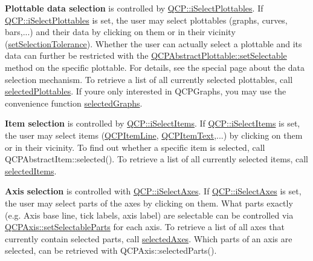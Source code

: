 {\bfseries Plottable data selection} is controlled by \mbox{\hyperlink{namespace_q_c_p_a2ad6bb6281c7c2d593d4277b44c2b037a67148c8227b4155eca49135fc274c7ec}{Q\+C\+P\+::i\+Select\+Plottables}}. If \mbox{\hyperlink{namespace_q_c_p_a2ad6bb6281c7c2d593d4277b44c2b037a67148c8227b4155eca49135fc274c7ec}{Q\+C\+P\+::i\+Select\+Plottables}} is set, the user may select plottables (graphs, curves, bars,...) and their data by clicking on them or in their vicinity (\mbox{\hyperlink{class_q_custom_plot_a4dc31241d7b09680950e19e5f971ed93}{set\+Selection\+Tolerance}}). Whether the user can actually select a plottable and its data can further be restricted with the \mbox{\hyperlink{class_q_c_p_abstract_plottable_ac238d6e910f976f1f30d41c2bca44ac3}{Q\+C\+P\+Abstract\+Plottable\+::set\+Selectable}} method on the specific plottable. For details, see the special page about the data selection mechanism. To retrieve a list of all currently selected plottables, call \mbox{\hyperlink{class_q_custom_plot_a747faaab57c56891e901a1e97fa4359a}{selected\+Plottables}}. If you\textquotesingle{}re only interested in Q\+C\+P\+Graphs, you may use the convenience function \mbox{\hyperlink{class_q_custom_plot_ad3547aded026d8a9ae6ef13a69080d06}{selected\+Graphs}}.

{\bfseries Item selection} is controlled by \mbox{\hyperlink{namespace_q_c_p_a2ad6bb6281c7c2d593d4277b44c2b037aea2f7c105d674e76d9b187b02ef29260}{Q\+C\+P\+::i\+Select\+Items}}. If \mbox{\hyperlink{namespace_q_c_p_a2ad6bb6281c7c2d593d4277b44c2b037aea2f7c105d674e76d9b187b02ef29260}{Q\+C\+P\+::i\+Select\+Items}} is set, the user may select items (\mbox{\hyperlink{class_q_c_p_item_line}{Q\+C\+P\+Item\+Line}}, \mbox{\hyperlink{class_q_c_p_item_text}{Q\+C\+P\+Item\+Text}},...) by clicking on them or in their vicinity. To find out whether a specific item is selected, call Q\+C\+P\+Abstract\+Item\+::selected(). To retrieve a list of all currently selected items, call \mbox{\hyperlink{class_q_custom_plot_afda487bcf2d6cf1a57173d82495e29ba}{selected\+Items}}.

{\bfseries Axis selection} is controlled with \mbox{\hyperlink{namespace_q_c_p_a2ad6bb6281c7c2d593d4277b44c2b037ad6644ac55bef621645326e9dd7469caa}{Q\+C\+P\+::i\+Select\+Axes}}. If \mbox{\hyperlink{namespace_q_c_p_a2ad6bb6281c7c2d593d4277b44c2b037ad6644ac55bef621645326e9dd7469caa}{Q\+C\+P\+::i\+Select\+Axes}} is set, the user may select parts of the axes by clicking on them. What parts exactly (e.\+g. Axis base line, tick labels, axis label) are selectable can be controlled via \mbox{\hyperlink{class_q_c_p_axis_a513f9b9e326c505d9bec54880031b085}{Q\+C\+P\+Axis\+::set\+Selectable\+Parts}} for each axis. To retrieve a list of all axes that currently contain selected parts, call \mbox{\hyperlink{class_q_custom_plot_a7e6b07792b1cb2c31681596582d14dbe}{selected\+Axes}}. Which parts of an axis are selected, can be retrieved with Q\+C\+P\+Axis\+::selected\+Parts().

